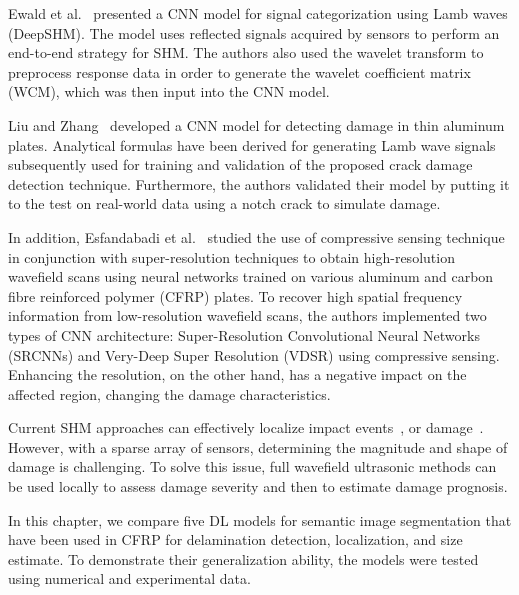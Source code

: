 Ewald et al.~\cite{Ewald2019b} presented a CNN model for signal categorization using Lamb waves (DeepSHM).
The model uses reflected signals acquired by sensors to perform an end-to-end strategy for SHM.
The authors also used the wavelet transform to preprocess response data in order to generate the wavelet coefficient matrix (WCM), which was then input into the CNN model.

Liu and Zhang~\cite{Liu2020a} developed a CNN model for detecting damage in thin aluminum plates.
Analytical formulas have been derived for generating Lamb wave signals subsequently used for training and validation of the proposed crack damage detection technique.
Furthermore, the authors validated their model by putting it to the test on real-world data using a notch crack to simulate damage.

In addition, Esfandabadi et al.~\cite{esfandabadideep} studied the use of compressive sensing technique~\cite{Candes2006} in conjunction with super-resolution techniques to obtain high-resolution wavefield scans using neural networks trained on various aluminum and carbon fibre reinforced polymer (CFRP) plates.
To recover high spatial frequency information from low-resolution wavefield scans, the authors implemented two types of CNN architecture: Super-Resolution Convolutional Neural Networks (SRCNNs) and Very-Deep Super Resolution (VDSR) using compressive sensing.
Enhancing the resolution, on the other hand, has a negative impact on the affected region, changing the damage characteristics.

Current SHM approaches can effectively localize impact events~\cite{Ciampa2012}, or damage~\cite{Nokhbatolfoghahai2020}.
However, with a sparse array of sensors, determining the magnitude and shape of damage is challenging.
To solve this issue, full wavefield ultrasonic methods can be used locally to assess damage severity and then to estimate damage prognosis.

In this chapter, we compare five DL models for semantic image segmentation that have been used in CFRP for delamination detection, localization, and size estimate.
To demonstrate their generalization ability, the models were tested using numerical and experimental data.
